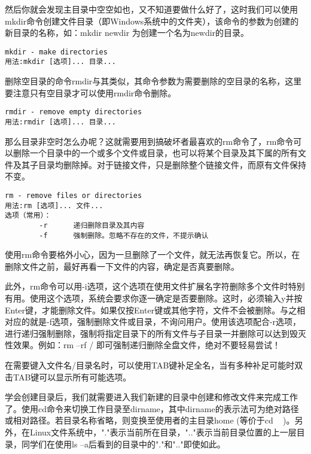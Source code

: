 然后你就会发现主目录中空空如也，又不知道要做什么好了，这时我们可以使用mkdir命令创建文件目录（即Windows系统中的文件夹），该命令的参数为创建的新目录的名称，如：mkdir newdir 为创建一个名为newdir的目录。

\begin{verbatim}
mkdir - make directories
用法:mkdir [选项]... 目录...
\end{verbatim}

删除空目录的命令rmdir与其类似，其命令参数为需要删除的空目录的名称，这里要注意只有空目录才可以使用rmdir命令删除。

\begin{verbatim}
rmdir - remove empty directories
用法:rmdir [选项]... 目录...
\end{verbatim}

那么目录非空时怎么办呢？这就需要用到搞破坏者最喜欢的rm命令了，rm命令可以删除一个目录中的一个或多个文件或目录，也可以将某个目录及其下属的所有文件及其子目录均删除掉。对于链接文件，只是删除整个链接文件，而原有文件保持不变。

\begin{verbatim}
rm - remove files or directories
用法:rm [选项]... 文件...
选项（常用）：
		-r		递归删除目录及其内容
		-f		强制删除。忽略不存在的文件，不提示确认
\end{verbatim}

\begin{note}
使用rm命令要格外小心，因为一旦删除了一个文件，就无法再恢复它。所以，在删除文件之前，最好再看一下文件的内容，确定是否真要删除。
\end{note}

此外，rm命令可以用-i选项，这个选项在使用文件扩展名字符删除多个文件时特别有用。使用这个选项，系统会要求你逐一确定是否要删除。这时，必须输入y并按Enter键，才能删除文件。如果仅按Enter键或其他字符，文件不会被删除。与之相对应的就是-f选项，强制删除文件或目录，不询问用户。使用该选项配合-r选项，进行递归强制删除，强制将指定目录下的所有文件与子目录一并删除可以达到毁灭性效果。例如：rm –rf / 即可强制递归删除全盘文件，绝对不要轻易尝试！

\begin{note}
在需要键入文件名/目录名时，可以使用TAB键补足全名，当有多种补足可能时双击TAB键可以显示所有可能选项。
\end{note}

学会创建目录后，我们就需要进入我们新建的目录中创建和修改文件来完成工作了。使用cd命令来切换工作目录至dirname，其中dirname的表示法可为绝对路径或相对路径。若目录名称省略，则变换至使用者的主目录home (等价于cd ~ )。另外，在Linux文件系统中，"."表示当前所在目录，".."表示当前目录位置的上一层目录，同学们在使用ls –a后看到的目录中的"."和".."即使如此。

